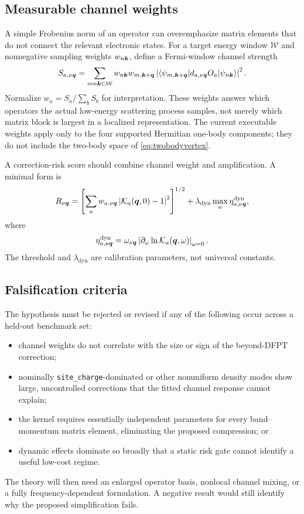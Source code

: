 \subsection{Measurable channel weights}

A simple Frobenius norm of an operator can overemphasize matrix elements that do
not connect the relevant electronic states.  For a target energy window
$\mathcal W$ and nonnegative sampling weights $w_{n\bm{k}}$, define a
Fermi-window channel strength
\begin{equation}
  S_{a,\nu\bm{q}}
  =\sum_{mn\bm{k}\in\mathcal W}
   w_{n\bm{k}}w_{m,\bm{k}+\bm{q}}
   \left|
   \langle\psi_{m,\bm{k}+\bm{q}}|
   d_{a,\nu\bm{q}}O_a
   |\psi_{n\bm{k}}\rangle
   \right|^2.
  \label{eq:channelstrength}
\end{equation}
Normalize $w_a=S_a/\sum_bS_b$ for interpretation.  These weights answer which
operators the actual low-energy scattering process samples, not merely which
matrix block is largest in a localized representation.  The current executable
weights apply only to the four supported Hermitian one-body components; they do
not include the two-body space of \cref{eq:twobodyvertex}.

A correction-risk score should combine channel weight and amplification.  A
minimal form is
\begin{equation}
  R_{\nu\bm{q}}
  =\left[
   \sum_a w_{a,\nu\bm{q}}
   \left|\mathcal K_a(\bm{q},0)-1\right|^2
  \right]^{1/2}
  +\lambda_{\mathrm{dyn}}\max_a\eta^{\mathrm{dyn}}_{a,\nu\bm{q}},
  \label{eq:risk}
\end{equation}
where
\begin{equation}
  \eta^{\mathrm{dyn}}_{a,\nu\bm{q}}
  =\omega_{\nu\bm{q}}
   \left|
   \partial_\omega\ln\mathcal K_a(\bm{q},\omega)
   \right|_{\omega=0}.
  \label{eq:dynamicrisk}
\end{equation}
The threshold and $\lambda_{\mathrm{dyn}}$ are calibration parameters, not
universal constants.

\subsection{Falsification criteria}

The hypothesis must be rejected or revised if any of the following occur across a
held-out benchmark set:

\begin{itemize}
  \item channel weights do not correlate with the size or sign of the
  beyond-DFPT correction;
  \item nominally \texttt{site\_charge}-dominated or other nonuniform density
  modes show large, uncontrolled corrections that the fitted channel response
  cannot explain;
  \item the kernel requires essentially independent parameters for every
  band--momentum matrix element, eliminating the proposed compression; or
  \item dynamic effects dominate so broadly that a static risk gate cannot
  identify a useful low-cost regime.
\end{itemize}

The theory will then need an enlarged operator basis, nonlocal channel mixing, or
a fully frequency-dependent formulation.  A negative result would still identify
why the proposed simplification fails.
